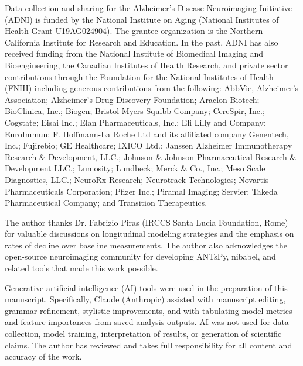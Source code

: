 \documentclass[blue]{ludusofficial}  %
\begin{document}
\begin{acknowledgments}
Data collection and sharing for the Alzheimer's Disease Neuroimaging Initiative (ADNI) is funded by the National Institute on Aging (National Institutes of Health Grant U19AG024904). The grantee organization is the Northern California Institute for Research and Education. In the past, ADNI has also received funding from the National Institute of Biomedical Imaging and Bioengineering, the Canadian Institutes of Health Research, and private sector contributions through the Foundation for the National Institutes of Health (FNIH) including generous contributions from the following: AbbVie, Alzheimer's Association; Alzheimer's Drug Discovery Foundation; Araclon Biotech; BioClinica, Inc.; Biogen; Bristol-Myers Squibb Company; CereSpir, Inc.; Cogstate; Eisai Inc.; Elan Pharmaceuticals, Inc.; Eli Lilly and Company; EuroImmun; F. Hoffmann-La Roche Ltd and its affiliated company Genentech, Inc.; Fujirebio; GE Healthcare; IXICO Ltd.; Janssen Alzheimer Immunotherapy Research \& Development, LLC.; Johnson \& Johnson Pharmaceutical Research \& Development LLC.; Lumosity; Lundbeck; Merck \& Co., Inc.; Meso Scale Diagnostics, LLC.; NeuroRx Research; Neurotrack Technologies; Novartis Pharmaceuticals Corporation; Pfizer Inc.; Piramal Imaging; Servier; Takeda Pharmaceutical Company; and Transition Therapeutics.

The author thanks Dr. Fabrizio Piras (IRCCS Santa Lucia Foundation, Rome) for valuable discussions on longitudinal modeling strategies and the emphasis on rates of decline over baseline measurements. The author also acknowledges the open-source neuroimaging community for developing ANTsPy, nibabel, and related tools that made this work possible.

Generative artificial intelligence (AI) tools were used in the preparation of this manuscript. Specifically, Claude (Anthropic) assisted with manuscript editing, grammar refinement, stylistic improvements, and with tabulating model metrics and feature importances from saved analysis outputs. AI was not used for data collection, model training, interpretation of results, or generation of scientific claims. The author has reviewed and takes full responsibility for all content and accuracy of the work.
\end{acknowledgments}



\end{document}
